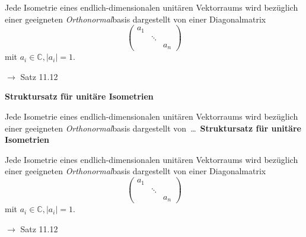\documentclass[11pt]{article}
\renewcommand{\cite}[1]{\par\bigskip\hfill{\color{gray}\tiny\(\to\) #1}}
\newcommand{\CC}{\mathbb{C}}
\let\olddots\dots
\renewcommand{\dots}{\,\olddots\,}
\newenvironment{field}{}{\newpage}
\newif\ifnote
\newenvironment{note}{\notetrue}{\notefalse}
\newcommand{\localtag}{}
\newcommand{\globaltag}{}
\newcommand{\tags}[1]{
    \ifnote
        \renewcommand{\localtag}{#1}
    \else
        \renewcommand{\globaltag}{#1}
    \fi
    }
\begin{document}
\begin{note}
\begin{field}
        Jede Isometrie eines endlich-dimensionalen unitären Vektorraums wird bezüglich einer geeigneten \emph{Orthonormal}basis dargestellt von einer Diagonalmatrix
        \[\begin{pmatrix}
             a_1 \\
            &\ddots\\
            &&a_n
        \end{pmatrix}\]
        mit $a_i \in \CC, \vert a_i \vert = 1$.
        \cite{Satz 11.12}
    \end{field}

    \begin{field}
        \textbf{Struktursatz für unitäre Isometrien}

        Jede Isometrie eines endlich-dimensionalen unitären Vektorraums wird bezüglich einer geeigneten \emph{Orthonormal}basis dargestellt von \dots
    \end{field}
    \begin{field}
        \textbf{Struktursatz für unitäre Isometrien}

        Jede Isometrie eines endlich-dimensionalen unitären Vektorraums wird bezüglich einer geeigneten \emph{Orthonormal}basis dargestellt von einer Diagonalmatrix
        \[\begin{pmatrix}
             a_1 \\
            &\ddots\\
            &&a_n
        \end{pmatrix}\]
        mit $a_i \in \CC, \vert a_i \vert = 1$.
        \cite{Satz 11.12}
    \end{field}
\end{note}

\tags{LinA-II-12-Hauptachsentransformation}
\end{document}
